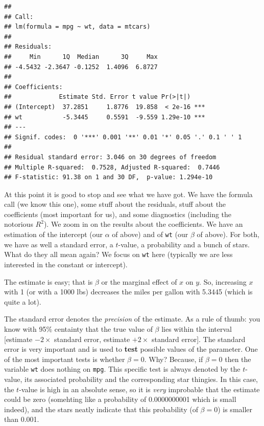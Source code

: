\documentclass[]{article}
\theoremstyle{definition}
\theoremstyle{definition}
\theoremstyle{definition}
\theoremstyle{remark}
\begin{document}
\begin{verbatim}
## 
## Call:
## lm(formula = mpg ~ wt, data = mtcars)
## 
## Residuals:
##     Min      1Q  Median      3Q     Max 
## -4.5432 -2.3647 -0.1252  1.4096  6.8727 
## 
## Coefficients:
##             Estimate Std. Error t value Pr(>|t|)    
## (Intercept)  37.2851     1.8776  19.858  < 2e-16 ***
## wt           -5.3445     0.5591  -9.559 1.29e-10 ***
## ---
## Signif. codes:  0 '***' 0.001 '**' 0.01 '*' 0.05 '.' 0.1 ' ' 1
## 
## Residual standard error: 3.046 on 30 degrees of freedom
## Multiple R-squared:  0.7528, Adjusted R-squared:  0.7446 
## F-statistic: 91.38 on 1 and 30 DF,  p-value: 1.294e-10
\end{verbatim}

At this point it is good to stop and see what we have got. We have the
formula call (we know this one), some stuff about the residuals, stuff
about the coefficients (most important for us), and some diagnostics
(including the notorious \(R^2\)). We zoom in on the results about the
coefficients. We have an estimation of the intercept (our \(\alpha\) of
above) and of \texttt{wt} (our \(\beta\) of above). For both, we have as
well a standard error, a \(t\)-value, a probability and a bunch of
stars. What do they all mean again? We focus on \texttt{wt} here
(typically we are less interested in the constant or intercept).

The estimate is easy; that is \(\beta\) or the marginal effect of \(x\)
on \(y\). So, increasing \(x\) with 1 (or with a 1000 lbs) decreases the
miles per gallon with 5.3445 (which is quite a lot).

The standard error denotes the \emph{precision} of the estimate. As a
rule of thumb: you know with 95\% centainty that the true value of
\(\beta\) lies within the interval {[}estimate \(- 2 \times\) standard
error, estimate \(+ 2 \times\) standard error{]}. The standard error is
very important and is used to \textbf{test} possible values of the
parameter. One of the most important tests is whether \(\beta=0\). Why?
Because, if \(\beta=0\) then the variable \texttt{wt} does nothing on
\texttt{mpg}. This specific test is always denoted by the \(t\)-value,
its associated probability and the corresponding star thingies. In this
case, the \(t\)-value is high in an absolute sense, so it is \emph{very}
improbable that the estimate could be zero (somehting like a probability
of 0.0000000001 which is small indeed), and the stars neatly indicate
that this probability (of \(\beta=0\)) is smaller than 0.001.
\end{document}
